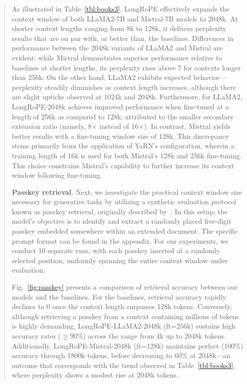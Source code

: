 \begin{abstract}
As illustrated in Table~\ref{tbl:books3}, LongRoPE effectively expands the context window of both LLaMA2-7B and Mistral-7B models to 2048k. At shorter context lengths ranging from 8k to 128k, it delivers perplexity results that are on par with, or better than, the baselines. Differences in performance between the 2048k variants of LLaMA2 and Mistral are evident: while Mistral demonstrates superior performance relative to baselines at shorter lengths, its perplexity rises above 7 for contexts longer than 256k. On the other hand, LLaMA2 exhibits expected behavior—perplexity steadily diminishes as context length increases, although there are slight upticks observed at 1024k and 2048k. Furthermore, for LLaMA2, LongRoPE-2048k achieves improved performance when fine-tuned at a length of 256k as compared to 128k, attributed to the smaller secondary extension ratio (namely, 8$\times$ instead of 16$\times$). In contrast, Mistral yields better results with a fine-tuning window size of 128k. This discrepancy stems primarily from the application of YaRN's configuration, wherein a training length of 16k is used for both Mistral's 128k and 256k fine-tuning. This choice constrains Mistral's capability to further increase its context window following fine-tuning.

\textbf{Passkey retrieval}. Next, we investigate the practical context window size necessary for generative tasks by utilizing a synthetic evaluation protocol known as passkey retrieval, originally described by~\cite{passkey}. In this setup, the model's objective is to identify and extract a randomly placed five-digit passkey embedded somewhere within an extended document. The specific prompt format can be found in the appendix. For our experiments, we conduct 10 separate runs, with each passkey inserted at a randomly selected position, uniformly spanning the entire context window under evaluation.

Fig.~\ref{fig:passkey} presents a comparison of retrieval accuracy between our models and the baselines. For the baselines, retrieval accuracy rapidly declines to 0 once the context length surpasses 128k tokens. Conversely, although retrieving a passkey from a context containing millions of tokens is highly demanding, LongRoPE-LLaMA2-2048k (ft=256k) sustains high accuracy rates ($\ge$90\%) across the range from 4k up to 2048k tokens. Additionally, LongRoPE-Mistral-2048k (ft=128k) maintains perfect (100\%) accuracy through 1800k tokens, before decreasing to 60\% at 2048k—an outcome that corresponds with the trend observed in Table~\ref{tbl:books3}, where perplexity shows a modest rise at 2048k tokens.


\end{abstract}
